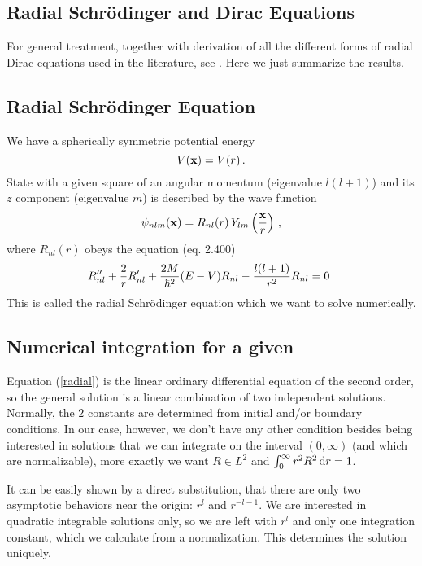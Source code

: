 \subsection{Radial Schrödinger and Dirac Equations}

For general treatment, together with derivation of all the different forms of
radial Dirac equations used in the literature, see \cite{bachelor-thesis}. Here we just summarize the results.

\subsection{Radial Schrödinger Equation}

We have a spherically symmetric potential energy 
\begin{equation*}
  V({\bf x})=V(r)\,.
\end{equation*}
State with a given square of an angular momentum (eigenvalue $l(l+1)$) and its $z$ component (eigenvalue $m$) is described by the wave function 
\begin{equation}
  \psi_{nlm}({\bf x})=R_{nl}(r)\,Y_{lm}\left({\bf x}\over r\right)\,,  \label{psi}
\end{equation}
where $R_{nl}(r)$ obeys the equation \cite{formanek} (eq. 2.400) 
\begin{equation}
  R_{nl}''+{2\over r}R_{nl}'+{2M\over\hbar^2}(E-V)R_{nl}- {l(l+1)\over r^2}R_{nl}=0\,.  \label{radial}
\end{equation}
This is called the radial Schrödinger equation which we want to solve numerically.

\subsection{Numerical integration for a given }

Equation (\ref{radial}) is the linear ordinary differential equation of the second order, so the general solution is a linear combination of two independent solutions. Normally, the $2$ constants are determined from initial and/or boundary conditions. In our case, however, we don't have any other condition besides being interested in solutions that we can integrate on the interval $(0,\infty)$ (and which are normalizable), more exactly we want $R\in L^2$ and $\int_0^\infty r^2R^2\,{\rm d} r=1$.

It can be easily shown by a direct substitution, that there are only two asymptotic behaviors near the origin: $r^l$ and $r^{-l-1}$. We are interested in quadratic integrable solutions only, so we are left with $r^l$ and only one integration constant, which we calculate from a normalization. This determines the solution uniquely.


